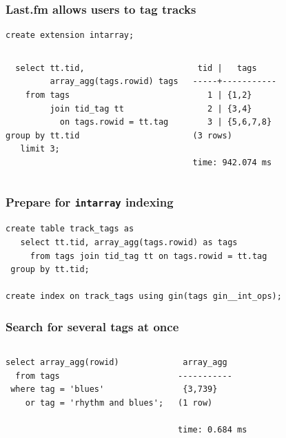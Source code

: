 \documentclass{beamer}
\begin{document}
\begin{frame}[fragile]
  \frametitle{Last.fm allows users to tag tracks}

\begin{verbatim}
create extension intarray;
\end{verbatim}
\vfill

\begin{columns}
\begin{verbatim}
  select tt.tid,
         array_agg(tags.rowid) tags
    from tags
         join tid_tag tt
           on tags.rowid = tt.tag
group by tt.tid
   limit 3;
\end{verbatim}  
\begin{verbatim}
 tid |   tags    
-----+-----------
   1 | {1,2}
   2 | {3,4}
   3 | {5,6,7,8}
(3 rows)

time: 942.074 ms
\end{verbatim}  
\end{columns}
\end{frame}

\begin{frame}[fragile]
  \frametitle{Prepare for \texttt{intarray} indexing}

  \vfill
  
\begin{verbatim}
create table track_tags as
   select tt.tid, array_agg(tags.rowid) as tags
     from tags join tid_tag tt on tags.rowid = tt.tag
 group by tt.tid;

create index on track_tags using gin(tags gin__int_ops);
\end{verbatim}  
\end{frame}

\begin{frame}[fragile]
  \frametitle{Search for several tags at once}

  \vfill

\begin{columns}
\begin{verbatim}
select array_agg(rowid)
  from tags
 where tag = 'blues'
    or tag = 'rhythm and blues';
\end{verbatim}  
\begin{verbatim}
 array_agg 
-----------
 {3,739}
(1 row)

time: 0.684 ms
\end{verbatim}  
\end{columns}
\end{frame}
\end{document}
